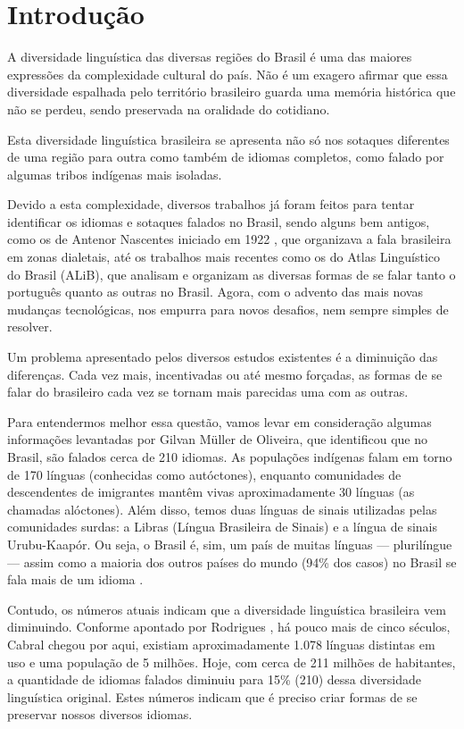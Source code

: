  \chapter{Introdução} %

\begin{flushleft}
A diversidade linguística das diversas regiões do Brasil é uma das maiores expressões da complexidade cultural do país. Não é um exagero afirmar que essa diversidade espalhada pelo território brasileiro guarda uma memória histórica que não se perdeu, sendo preservada na oralidade do cotidiano.

Esta diversidade linguística brasileira se apresenta não só nos sotaques diferentes de uma região para outra como também de idiomas completos, como falado por algumas tribos indígenas mais isoladas.

Devido a esta complexidade, diversos trabalhos já foram feitos para tentar identificar os idiomas e sotaques falados no Brasil, sendo alguns bem antigos, como os de Antenor Nascentes iniciado em 1922 \cite{nascentes1953}, que organizava a fala brasileira em zonas dialetais, até os trabalhos mais recentes como os do Atlas Linguístico do Brasil (ALiB), que analisam e organizam as diversas formas de se falar tanto o português quanto as outras no Brasil. Agora, com o advento das mais novas mudanças tecnológicas, nos empurra para novos desafios, nem sempre simples de resolver.

Um problema apresentado pelos diversos estudos existentes é a diminuição das diferenças. Cada vez mais, incentivadas ou até mesmo forçadas, as formas de se falar do brasileiro cada vez se tornam mais parecidas uma com as outras.

Para entendermos melhor essa questão, vamos levar em consideração algumas informações levantadas por Gilvan Müller de Oliveira, que identificou que no Brasil, são falados cerca de 210 idiomas. As populações indígenas falam em torno de 170 línguas (conhecidas como autóctones), enquanto comunidades de descendentes de imigrantes mantêm vivas aproximadamente 30 línguas (as chamadas alóctones). Além disso, temos duas línguas de sinais utilizadas pelas comunidades surdas: a Libras (Língua Brasileira de Sinais) e a língua de sinais Urubu-Kaapór. Ou seja, o Brasil é, sim, um país de muitas línguas — plurilíngue — assim como a maioria dos outros países do mundo (94\% dos casos) no Brasil se fala mais de um idioma \cite{noauthor_plurilinguismo_nodate}.

Contudo, os números atuais indicam que a diversidade linguística brasileira vem diminuindo. Conforme apontado por Rodrigues \cite{rodrigues_linguas_nodate}, há pouco mais de cinco séculos, Cabral chegou por aqui, existiam aproximadamente 1.078 línguas distintas em uso e uma população de 5 milhões. Hoje, com cerca de 211 milhões de habitantes, a quantidade de idiomas falados diminuiu para 15\% (210) dessa diversidade linguística original. Estes números indicam que é preciso criar formas de se preservar nossos diversos idiomas.


\end{flushleft}
